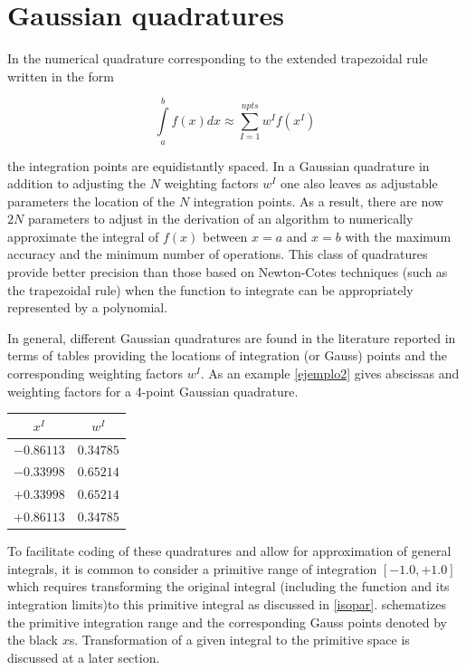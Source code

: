 \section{Gaussian quadratures}
In the numerical quadrature corresponding to the extended trapezoidal rule written in the form

\begin{equation}
\int\limits_a^b {f(x)dx \approx \sum\limits_{I = 1}^{npts} {{w^I}f({x^I})} }
\label{quadra2}
\end{equation}

the integration points are equidistantly spaced. In a Gaussian quadrature in addition to adjusting the $N$ weighting factors $w^I$ one also leaves as adjustable parameters the location of the $N$ integration points. As a result, there are now $2N$ parameters to adjust in the derivation of an algorithm to numerically approximate the integral of $f(x)$ between $x=a$ and $x=b$ with the maximum accuracy and the minimum number of operations. This class of quadratures provide better precision than those based on Newton-Cotes techniques (such as the trapezoidal rule) when the function to integrate can be appropriately represented by a polynomial.

In general, different Gaussian quadratures are found in the literature reported in terms of tables providing the locations of integration (or Gauss) points and the corresponding weighting factors $w^I$. As an example \cref{ejemplo2} gives abscissas and weighting factors for a 4-point Gaussian quadrature.

\begin{center}
\begin{tabular}{cc}
  \hline
  $x^I$ & $w^I$ \\
  \hline 
  $-0.86113$  & $0.34785$  \\
  $-0.33998$  & $0.65214$  \\
  $ +0.33998$  & $0.65214$  \\
  $ +0.86113$  & $0.34785$  \\
  \hline
\end{tabular}
\label{ejemplo2}
\end{center}

To facilitate coding of these quadratures and allow for approximation of general integrals, it is common to consider a primitive range of integration $[-1.0,+1.0]$ which requires transforming the original integral (including the function and its integration limits)to this primitive integral as discussed in \cref{isopar}.  schematizes the primitive integration range and the corresponding Gauss points denoted by the black $x$s. Transformation of a given integral to the primitive space is discussed at a later section.

